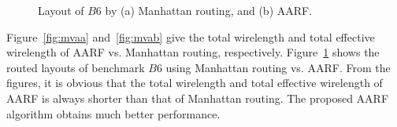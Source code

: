 \documentclass[journal]{IEEEtran}
\begin{document}
\begin{figure}[htbp]
	\centering
	\hfil
	\caption{Layout of $B6$ by (a) Manhattan routing, and (b) AARF.}
	\label{fig:b6}
\end{figure}

Figure~\ref{fig:mvaa} and~\ref{fig:mvab} give the total wirelength and total effective wirelength of AARF vs. Manhattan routing, respectively. Figure~\ref{fig:b6} shows the routed layouts of benchmark $B6$ using Manhattan routing vs. AARF. From the figures, it is obvious that the total wirelength and total effective wirelength of AARF is always shorter than that of Manhattan routing. The proposed AARF algorithm obtains much better performance.
\end{document}
